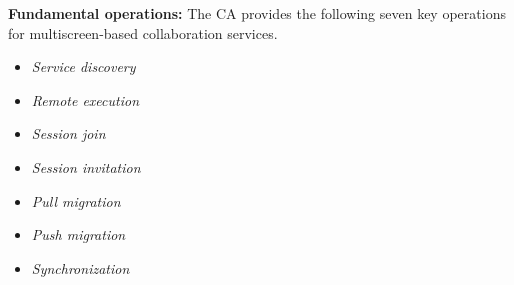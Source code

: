 \documentclass{sig-alternate}
\newcommand{\bi}{\begin{itemize}}
\newcommand{\ei}{\end{itemize}}
\newcommand{\ii}{\item}
\begin{document}
\noindent
\textbf{Fundamental operations:} The CA provides the following seven key operations for multiscreen-based collaboration services.
\bi
\ii  \textit{Service discovery}
\ii \textit{Remote execution}
\ii  \textit{Session join}
\ii  \textit{Session invitation}
\ii \textit{Pull migration}
\ii \textit{Push migration}
\ii \textit{Synchronization}
\ei

%
%
%
%
%
%
\end{document}
